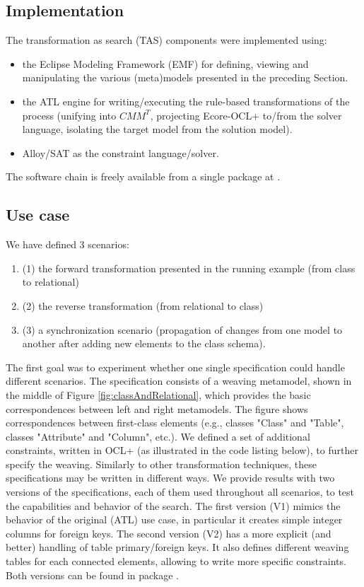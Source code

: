 \documentclass{llncs}
\begin{document}
\subsection{Implementation}
%
The transformation as search (TAS) components were implemented using:
\begin{itemize}
\item the Eclipse Modeling Framework (EMF) \cite{ECORE} for defining, viewing and manipulating the various (meta)models presented in the preceding Section.
\item the ATL engine \cite{JouaultK05} for writing/executing the rule-based transformations of the process (unifying into $CMM^T$, projecting Ecore-OCL+ to/from the solver language, isolating the target model from the solution model).
\item Alloy/SAT \cite{DBLP:conf/sigsoft/Jackson00} as the constraint language/solver.
\end{itemize}
The software chain is freely available from a single package at \cite{TAS-CLAR-usecase}.

%
\subsection{Use case}
%
We have defined 3 scenarios:
\begin{enumerate} 
\item (1) the forward transformation presented in the running example (from class to relational)
\item (2) the reverse transformation (from relational to class)
\item (3) a synchronization scenario (propagation of changes from one model to another after adding new elements to the class schema). 
\end{enumerate}
The first goal was to experiment whether one single specification could handle different scenarios. The specification consists of a weaving metamodel, shown in the middle of Figure \ref{fig:classAndRelational}, which provides the basic correspondences between left and right metamodels. The figure shows correspondences between first-class elements (e.g., classes "Class" and "Table", classes "Attribute" and "Column", etc.). We defined a set of additional constraints, written in OCL+ (as illustrated in the code listing below), to further specify the weaving. Similarly to other transformation techniques, these specifications may be written in different ways. We provide results with two versions of the specifications, each of them used throughout all scenarios, to test the capabilities and behavior of the search. The first version (V1) mimics the behavior of the original (ATL) use case, in particular it creates simple integer columns for foreign keys. The second version (V2) has a more explicit (and better) handling of table primary/foreign keys. It also defines different weaving tables for each connected elements, allowing to write more specific constraints. Both versions can be found in package \cite{TAS-CLAR-usecase}.\\
\end{document}
